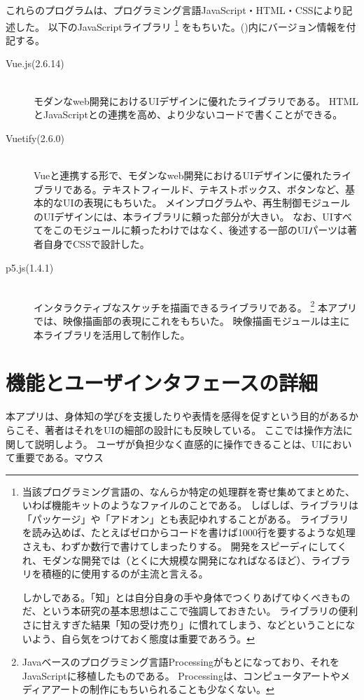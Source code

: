 これらのプログラムは、プログラミング言語JavaScript・HTML・CSSにより記述した。
以下のJavaScriptライブラリ
\footnote{\label{foot:ライブラリ}
  当該プログラミング言語の、なんらか特定の処理群を寄せ集めてまとめた、いわば機能キットのようなファイルのことである。
しばしば、ライブラリは「パッケージ」や「アドオン」とも表記ゆれすることがある。
ライブラリを読み込めば、たとえばゼロからコードを書けば1000行を要するような処理さえも、わずか数行で書けてしまったりする。
開発をスピーディにしてくれ、モダンな開発では（とくに大規模な開発になればなるほど）、ライブラリを積極的に使用するのが主流と言える。

しかしである。「知」とは自分自身の手や身体でつくりあげてゆくべきものだ、という本研究の基本思想はここで強調しておきたい。
ライブラリの便利さに甘えすぎた結果「知の受け売り」に慣れてしまう、などということにないよう、自ら気をつけておく態度は重要であろう。
}
をもちいた。()内にバージョン情報を付記する。
\begin{description}
  \item [Vue.js(2.6.14)]\mbox{}\\
    モダンなweb開発におけるUIデザインに優れたライブラリである。
    HTMLとJavaScriptとの連携を高め、より少ないコードで書くことができる。
  \item [Vuetify(2.6.0)]\mbox{}\\
    Vueと連携する形で、モダンなweb開発におけるUIデザインに優れたライブラリである。テキストフィールド、テキストボックス、ボタンなど、基本的なUIの表現にもちいた。
    メインプログラムや、再生制御モジュールのUIデザインには、本ライブラリに頼った部分が大きい。
    なお、UIすべてをこのモジュールに頼ったわけではなく、後述する一部のUIパーツは著者自身でCSSで設計した。
  \item [p5.js(1.4.1)]\mbox{}\\
    インタラクティブなスケッチを描画できるライブラリである。
    \footnote{Javaベースのプログラミング言語Processingがもとになっており、それをJavaScriptに移植したものである。
    Processingは、コンピュータアートやメディアアートの制作にもちいられることも少なくない。
    }
    本アプリでは、映像描画部の表現にこれをもちいた。\cite{p5}
    映像描画モジュールは主に本ライブラリを活用して制作した。
\end{description}

\section{機能とユーザインタフェースの詳細}
本アプリは、身体知の学びを支援したりや表情を感得を促すという目的があるからこそ、著者はそれをUIの細部の設計にも反映している。
ここでは操作方法に関して説明しよう。
ユーザが負担少なく直感的に操作できることは、UIにおいて重要である。マウス
